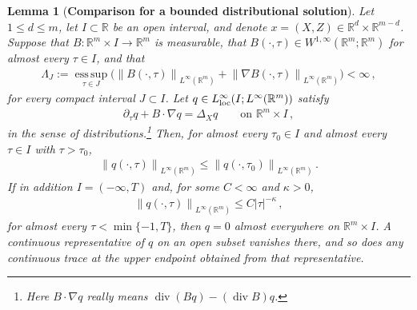 \documentclass[11pt,reqno]{amsproc}
\numberwithin{equation}{section}
\newtheorem{lemma}[theorem]{Lemma}
\theoremstyle{remark}
\newcommand{\p}{\partial}
\newcommand{\RR}{\mathbb R}
\newcommand{\norm}[1]{\left\|#1\right\|}
\renewcommand{\div}{\operatorname{div}}
\newcommand{\esssup}{\operatorname*{ess\,sup}}
\begin{document}
\begin{lemma}[{\bf Comparison for a bounded distributional solution}]
\label{lem:aniso:comparison}
Let $1\le d\le m$, let $I\subset\RR$ be an open interval, and denote $x=(X,Z)\in\RR^d\times\RR^{m-d}$. Suppose that $B\colon\RR^m\times I\to\RR^m$ is measurable, that $B(\cdot,\tau)\in W^{1,\infty}(\RR^m;\RR^m)$ for almost every $\tau\in I$, and that
\begin{align}
\Lambda_J:=\esssup_{\tau\in J}
\big(\norm{B(\cdot,\tau)}_{L^\infty(\RR^m)}
+\norm{\nabla B(\cdot,\tau)}_{L^\infty(\RR^m)}\big)<\infty
\,,
\label{eq:aniso:comparison:drift}
\end{align}
for every compact interval $J\subset I$. 
Let $q\in L^\infty_{\rm loc}(I;L^\infty(\RR^m))$ satisfy
\begin{align}
\p_\tau q+B\cdot\nabla q=\Delta_Xq
\qquad\mbox{on }\RR^m\times I
\,,
\label{eq:aniso:comparison:equation}
\end{align}
in the sense of distributions.\footnote{Here $B\cdot\nabla q$ really means $\div(Bq)-(\div B)q$.} Then, for almost every $\tau_0\in I$ and almost every $\tau\in I$ with $\tau>\tau_0$,
\begin{align}
\norm{q(\cdot,\tau)}_{L^\infty(\RR^m)}
\le\norm{q(\cdot,\tau_0)}_{L^\infty(\RR^m)}
\,.
\label{eq:aniso:comparison:conclusion}
\end{align}
If in addition $I=(-\infty,T)$ and, for some $C<\infty$ and $\kappa>0$,
\begin{align}
\norm{q(\cdot,\tau)}_{L^\infty(\RR^m)}\le C|\tau|^{-\kappa}
\,,
\label{eq:aniso:ancient:decay}
\end{align}
for almost every $\tau<\min\{-1,T\}$, 
then $q=0$ almost everywhere on $\RR^m\times I$. A continuous representative of $q$ on an open subset vanishes there, and so does any continuous trace at the upper endpoint obtained from that representative.
\end{lemma}
\end{document}
